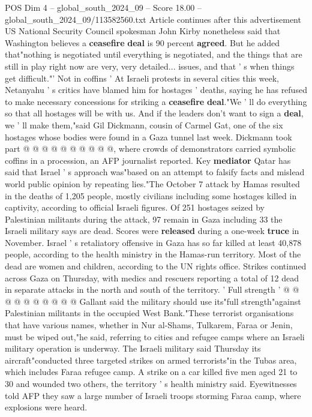 \begin{textsample}{POS Dim 4 – global\_south\_2024\_09 – Score 18.00 – global\_south\_2024\_09/113582560.txt}
Article continues after this advertisement US National Security Council spokesman John Kirby nonetheless said that Washington believes a \textbf{ceasefire} \textbf{deal} is 90 percent \textbf{agreed}.
But he added that"nothing is negotiated until everything is negotiated, and the things that are still in play right now are very, very detailed... issues, and that ' s when things get difficult."' Not in coffins ' At Israeli protests in several cities this week, Netanyahu ' s critics have blamed him for hostages ' deaths, saying he has refused to make necessary concessions for striking a \textbf{ceasefire} \textbf{deal}."We ' ll do everything so that all hostages will be with us.
And if the leaders don't want to sign a \textbf{deal}, we ' ll make them,"said Gil Dickmann, cousin of Carmel Gat, one of the six hostages whose bodies were found in a Gaza tunnel last week.
Dickmann took part @ @ @ @ @ @ @ @ @ @, where crowds of demonstrators carried symbolic coffins in a procession, an AFP journalist reported.
Key \textbf{mediator} Qatar has said that Israel ' s approach was"based on an attempt to falsify facts and mislead world public opinion by repeating lies."The October 7 attack by Hamas resulted in the deaths of 1,205 people, mostly civilians including some hostages killed in captivity, according to official Israeli figures.
Of 251 hostages seized by Palestinian militants during the attack, 97 remain in Gaza including 33 the Israeli military says are dead.
Scores were \textbf{released} during a one-week \textbf{truce} in November.
Israel ' s retaliatory offensive in Gaza has so far killed at least 40,878 people, according to the health ministry in the Hamas-run territory.
Most of the dead are women and children, according to the UN rights office.
Strikes continued across Gaza on Thursday, with medics and rescuers reporting a total of 12 dead in separate attacks in the north and south of the territory. ' Full strength ' @ @ @ @ @ @ @ @ @ @ Gallant said the military should use its"full strength"against Palestinian militants in the occupied West Bank."These terrorist organisations that have various names, whether in Nur al-Shams, Tulkarem, Faraa or Jenin, must be wiped out,"he said, referring to cities and refugee camps where an Israeli military operation is underway.
The Israeli military said Thursday its aircraft"conducted three targeted strikes on armed terrorists"in the Tubas area, which includes Faraa refugee camp.
A strike on a car killed five men aged 21 to 30 and wounded two others, the territory ' s health ministry said.
Eyewitnesses told AFP they saw a large number of Israeli troops storming Faraa camp, where explosions were heard.

\end{textsample}
